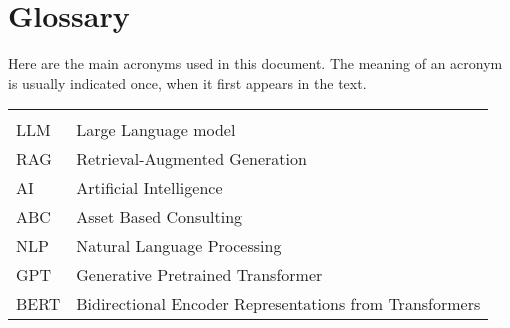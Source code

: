 \chapter*{Glossary}

Here are the main acronyms used in this document. The meaning of an acronym is usually indicated once, when it first appears in the text.

\begin{longtable}{lp{9cm}}
         &                                                         \\
    LLM  & Large Language model                                    \\
    RAG  & Retrieval-Augmented Generation                          \\
    AI   & Artificial Intelligence                                 \\
    ABC  & Asset Based Consulting                                  \\
    NLP  & Natural Language Processing                             \\
    GPT  & Generative Pretrained Transformer                       \\
    BERT & Bidirectional Encoder Representations from Transformers \\
\end{longtable}
